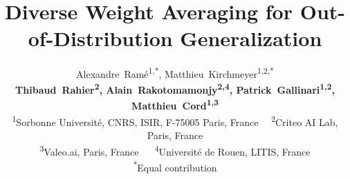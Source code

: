\documentclass{article}
\makeatletter
\renewcommand\maketitle{\par
  \begingroup
    \@maketitle
    \@thanks
    \@notice
    \thispagestyle{empty}
  \endgroup
  \setcounter{footnote}{0}%
}
\makeatother
\begin{document}
%
\title{Diverse Weight Averaging for Out-of-Distribution Generalization}
%
%

\author{%
  Alexandre~Ramé\textsuperscript{1,*}, Matthieu~Kirchmeyer\textsuperscript{1,2,*} \\ \textbf{Thibaud~Rahier\textsuperscript{2}, Alain~Rakotomamonjy\textsuperscript{2,4}, Patrick~Gallinari\textsuperscript{1,2}, Matthieu~Cord\textsuperscript{1,3}}\\
  \textsuperscript{1}Sorbonne Université, CNRS, ISIR, F-75005 Paris, France
  ~~\textsuperscript{2}Criteo AI Lab, Paris, France \\
  \textsuperscript{3}Valeo.ai, Paris, France ~~
  \textsuperscript{4}Université de Rouen, LITIS, France \\
  \textsuperscript{*}Equal contribution\\
}

%
\maketitle
%
\begin{abstract}
    
\end{abstract}









% 



\newpage
\begin{appendices}
    \appendix
    
\end{appendices}
\end{document}
